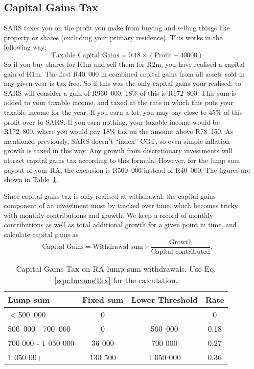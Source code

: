 \documentclass[a4paper, justified]{tufte-handout}
\begin{document}
\subsection{Capital Gains Tax}
SARS taxes you on the profit you make from buying and selling things like property or shares (excluding your primary residence).
This works in the following way:
\begin{equation}
\textrm{Taxable Capital Gains} = 0.18\times(\textrm{Profit} - 40 000)
\end{equation}
So if you buy shares for R1m and sell them for R2m, you have realised a capital gain of R1m. The first R40~000 in combined capital gains from all assets sold in any given year is tax free. So if this was the only capital gains your realised, to SARS will consider a gain of R960~000. 18\% of this is R172~800. This sum is added to your taxable income, and taxed at the rate in which this puts your taxable income for the year. If you earn a lot, you may pay close to 45\% of this profit over to SARS. If you earn nothing, your taxable income would be R172~800, where you would pay 18\% tax on the amount above R78~150. As mentioned previously, SARS doesn't ``index'' CGT, so even simple inflation-growth is taxed in this way. Any growth from discretionary investments will attract capital gains tax according to this formula. However, for the lump sum payout of your RA, the exclusion is R500~000 instead of R40~000. The figures are shown in Table~\ref{tab:CGTRA}.

Since capital gains tax is only realised at withdrawal, the capital gains component of an investment must by tracked over time, which becomes tricky with monthly contributions and growth. We keep a record of monthly contributions as well as total additional growth for a given point in time, and calculate capital gains as
\begin{equation}
\textrm{Capital Gains} = \textrm{Withdrawal sum}\times\frac{\textrm{Growth}}{\textrm{Capital contributed}}.
\end{equation}

\begin{table}[]
	\centering
	\caption{Capital Gains Tax on RA lump sum withdrawals. Use Eq.\ref{equ:IncomeTax} for the calculation.}
	\label{tab:CGTRA}
	\begin{tabular}{lccc}
		\toprule
		\textbf{Lump sum}  & \textbf{Fixed sum} & \textbf{Lower Threshold} & \textbf{Rate} \\
		\midrule
		$<$500~000            & 0         &          & 0 \\
		500~000 - 700~000  & 0    & 500~000         & 0.18 \\
		700 000 - 1 050 000  & 36 000   & 700 000          & 0.27  \\
		1 050 00+  & 130 500   & 1 050 000      & 0.36  \\
		\bottomrule
	\end{tabular}
\end{table}
\end{document}
